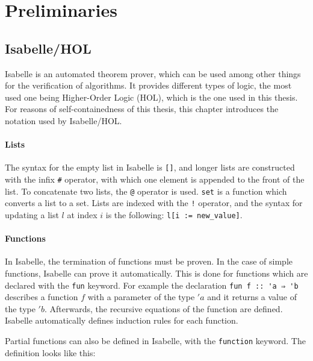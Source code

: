 
\chapter{Preliminaries}\label{chapter:preliminaries}

\section{Isabelle/HOL}

Isabelle\cite{isabelle} is an automated theorem prover, which can be used among other things for the verification of algorithms. It provides different types of logic, the most used one being Higher-Order Logic (HOL), which is the one used in this thesis. For reasons of self-containedness of this thesis, this chapter introduces the notation used by Isabelle/HOL.

\subsubsection{Lists}

The syntax for the empty list in Isabelle is \lstinline|[]|, and longer lists are constructed with the infix \lstinline|#| operator, with which one element is appended to the front of the list. To concatenate two lists, the \lstinline|@| operator is used. \lstinline|set| is a function which converts a list to a set. Lists are indexed with the \lstinline|!| operator, and the syntax for updating a list $l$ at index $i$ is the following: \lstinline|l[i := new_value]|.

\subsubsection{Functions}

In Isabelle, the termination of functions must be proven. In the case of simple functions, Isabelle can prove it automatically. This is done for functions which are declared with the \lstinline{fun} keyword. For example the declaration \lstinline|fun f :: 'a ⇒ 'b| describes a function $f$ with a parameter of the type $'a$ and it returns a value of the type $'b$. Afterwards, the recursive equations of the function are defined. Isabelle automatically defines induction rules for each function.

Partial functions can also be defined in Isabelle, with the \lstinline{function} keyword.
The definition looks like this:

